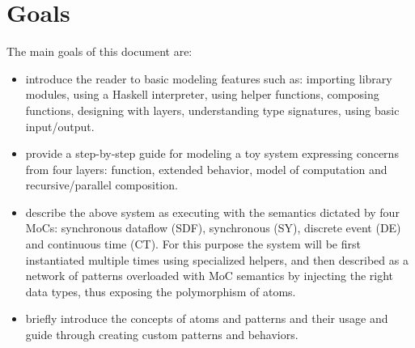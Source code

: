 
\section{Goals}
\label{sec:goals}

The main goals of this document are:
\begin{itemize}
\item introduce the reader to basic modeling features such as: importing library modules, using a Haskell interpreter, using helper functions, composing functions, designing with layers, understanding type signatures, using basic input/output.
\item provide a step-by-step guide for modeling a toy system expressing concerns from four layers: function, extended behavior, model of computation and recursive/parallel composition. 
\item describe the above system as executing with the semantics dictated by four MoCs: synchronous dataflow (SDF), synchronous (SY), discrete event (DE) and continuous time (CT). For this purpose the system will be first instantiated multiple times using specialized helpers, and then described as a network of patterns overloaded with MoC semantics by injecting the right data types, thus exposing the polymorphism of atoms. 
\item briefly introduce the concepts of atoms and patterns and their usage and guide through creating custom patterns and behaviors.
\end{itemize}


